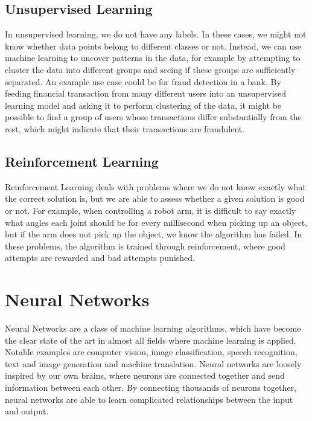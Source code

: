 \documentclass[UKenglish]{uiomasterthesis} %
\theoremstyle{definition}
\begin{document}
\subsection{Unsupervised Learning}

In unsupervised learning, we do not have any labels. In these cases, we might not know whether data points belong to different classes or not. Instead, we can use machine learning to uncover patterns in the data, for example by attempting to cluster the data into different groups and seeing if these groups are sufficiently separated. An example use case could be for fraud detection in a bank. By feeding financial transaction from many different users into an unsupervised learning model and asking it to perform clustering of the data, it might be possible to find a group of users whose transactions differ substantially from the rest, which might indicate that their transactions are fraudulent.

\subsection{Reinforcement Learning}

Reinforcement Learning deals with problems where we do not know exactly what the correct solution is, but we are able to assess whether a given solution is good or not. For example, when controlling a robot arm, it is difficult to say exactly what angles each joint should be for every millisecond when picking up an object, but if the arm does not pick up the object, we know the algorithm has failed. In these problems, the algorithm is trained through reinforcement, where good attempts are rewarded and bad attempts punished.

\section{Neural Networks}

Neural Networks are a class of machine learning algorithms, which have become the clear state of the art in almost all fields where machine learning is applied. Notable examples are computer vision, image classification, speech recognition, text and image generation and machine translation. Neural networks are loosely inspired by our own brains, where neurons are connected together and send information between each other. By connecting thousands of neurons together, neural networks are able to learn complicated relationships between the input and output.
\end{document}
